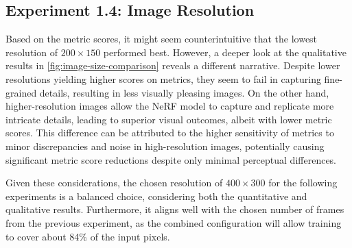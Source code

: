 \subsection{Experiment 1.4: Image Resolution}
Based on the metric scores, it might seem counterintuitive that the lowest resolution of $200 \times 150$ performed best. However, a deeper look at the qualitative results in \autoref{fig:image-size-comparison} reveals a different narrative. Despite lower resolutions yielding higher scores on metrics, they seem to fail in capturing fine-grained details, resulting in less visually pleasing images. On the other hand, higher-resolution images allow the NeRF model to capture and replicate more intricate details, leading to superior visual outcomes, albeit with lower metric scores. This difference can be attributed to the higher sensitivity of metrics to minor discrepancies and noise in high-resolution images, potentially causing significant metric score reductions despite only minimal perceptual differences.

Given these considerations, the chosen resolution of $400 \times 300$ for the following experiments is a balanced choice, considering both the quantitative and qualitative results. Furthermore, it aligns well with the chosen number of frames from the previous experiment, as the combined configuration will allow training to cover about 84\% of the input pixels.

